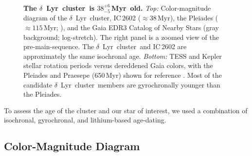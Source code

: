 \documentclass[12pt,modern,twocolumn,tighten]{aastex63}
\newcommand{\cn}{$\delta$\ Lyr\ cluster} %
\newcommand{\clusterage}{$38^{+6}_{-5}$\,Myr} %
\begin{document}
\begin{figure}[tp]
\begin{center}
		\vspace{-0.5cm}
	\end{center}
	\vspace{-0.7cm}
	\caption{
    {\bf The \cn\ is \clusterage\ old.}  {\it Top:}
    Color-magnitude diagram of the \cn, IC\,2602 ($\approx38$\,Myr),
    the Pleiades ($\approx 115$\,Myr; \citealt{dahm_2015}), and the
    Gaia EDR3 Catalog of Nearby Stars (gray background;
    log-stretch).  The right panel is a zoomed view of 
    the pre-main-sequence.  The \cn\ and IC\,2602 are approximately
    the same isochronal age.  {\it Bottom:} TESS and Kepler stellar
    rotation periods versus dereddened Gaia colors, with the Pleiades
    and Praesepe (650\,Myr) shown for reference
    \citep{rebull_rotation_2016a,douglas_poking_2017}.  Most of the
    candidate \cn\ members are gyrochronally younger than the
    Pleiades.
   \label{fig:age}
	}
\end{figure}

To assess the age of the cluster and our star of interest, we used a
combination of isochronal, gyrochronal, and lithium-based
age-dating.

\subsection{Color-Magnitude Diagram}
\label{sec:cmd}
\end{document}
